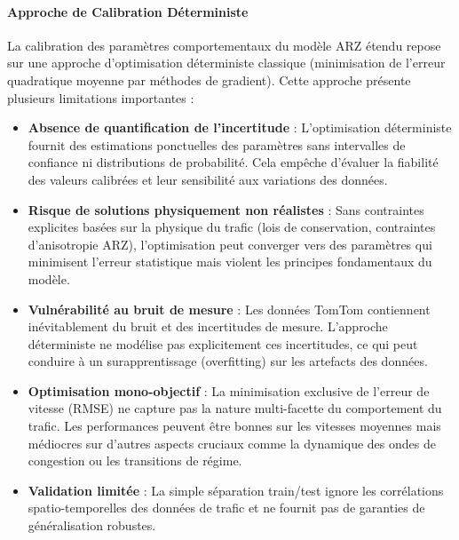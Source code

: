 \paragraph{Approche de Calibration Déterministe}
La calibration des paramètres comportementaux du modèle ARZ étendu repose sur une approche d'optimisation déterministe classique (minimisation de l'erreur quadratique moyenne par méthodes de gradient). Cette approche présente plusieurs limitations importantes :

\begin{itemize}
    \item \textbf{Absence de quantification de l'incertitude} : L'optimisation déterministe fournit des estimations ponctuelles des paramètres sans intervalles de confiance ni distributions de probabilité. Cela empêche d'évaluer la fiabilité des valeurs calibrées et leur sensibilité aux variations des données.
    \item \textbf{Risque de solutions physiquement non réalistes} : Sans contraintes explicites basées sur la physique du trafic (lois de conservation, contraintes d'anisotropie ARZ), l'optimisation peut converger vers des paramètres qui minimisent l'erreur statistique mais violent les principes fondamentaux du modèle.
    \item \textbf{Vulnérabilité au bruit de mesure} : Les données TomTom contiennent inévitablement du bruit et des incertitudes de mesure. L'approche déterministe ne modélise pas explicitement ces incertitudes, ce qui peut conduire à un surapprentissage (overfitting) sur les artefacts des données.
    \item \textbf{Optimisation mono-objectif} : La minimisation exclusive de l'erreur de vitesse (RMSE) ne capture pas la nature multi-facette du comportement du trafic. Les performances peuvent être bonnes sur les vitesses moyennes mais médiocres sur d'autres aspects cruciaux comme la dynamique des ondes de congestion ou les transitions de régime.
    \item \textbf{Validation limitée} : La simple séparation train/test ignore les corrélations spatio-temporelles des données de trafic et ne fournit pas de garanties de généralisation robustes.
\end{itemize}

